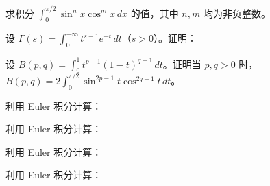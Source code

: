 \newpage
\noindent\begin{minipage}{\textwidth}
求积分 $\displaystyle\int_0^{\pi/2}\sin^n x\cos^m x\,dx$ 的值，其中 $n,m$ 均为非负整数。
\end{minipage}\par\vfill
\noindent\begin{minipage}{\textwidth}
设 $\displaystyle\Gamma(s)=\int_0^{+\infty}t^{s-1}e^{-t}\,dt$（$s>0$）。证明：
\end{minipage}\par\vfill
\noindent\begin{minipage}{\textwidth}
设 $\displaystyle B(p,q)=\int_0^1t^{p-1}(1-t)^{q-1}\,dt$。证明当 $p,q>0$ 时，$\displaystyle B(p,q)=2\int_0^{\pi/2}\sin^{2p-1}t\cos^{2q-1}t\,dt$。
\end{minipage}\par\vfill
\noindent\begin{minipage}{\textwidth}
利用 Euler 积分计算：
\end{minipage}\par\vfill
\newpage
\noindent\begin{minipage}{\textwidth}
利用 Euler 积分计算：
\end{minipage}\par\vfill
\noindent\begin{minipage}{\textwidth}
利用 Euler 积分计算：
\end{minipage}\par\vfill
\noindent\begin{minipage}{\textwidth}
利用 Euler 积分计算：
\end{minipage}\par\vfill
